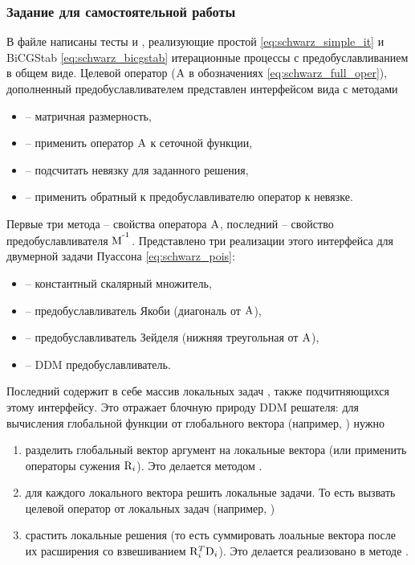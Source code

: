 \subsubsection{Задание для самостоятельной работы}

В файле 
написаны тесты  и ,
реализующие простой \cref{eq:schwarz_simple_it} и BiCGStab \cref{eq:schwarz_bicgstab} итерационные процессы с предобуславливанием
в общем виде.
Целевой оператор (${\rm A}$ в обозначениях \cref{eq:schwarz_full_oper}), дополненный предобуславливателем представлен интерфейсом вида
с методами
\begin{itemize}
\item {} -- матричная размерность,
\item {} -- применить оператор ${\rm A}$ к сеточной функции,
\item {} -- подсчитать невязку для заданного решения,
\item {} -- применить обратный к предобуславливателю оператор к невязке.
\end{itemize}
Первые три метода -- свойства оператора ${\rm A}$, последний -- свойство предобуславливателя ${\rm M}^{\textsuperscript {-1}}$.
Представлено три реализации этого интерфейса для двумерной задачи Пуассона \cref{eq:schwarz_pois}:
\begin{itemize}
\item {} -- константный скалярный множитель,
\item {} -- предобуславливатель Якоби (диагональ от ${\rm A}$),
\item {} -- предобуславливатель Зейделя (нижняя треугольная от ${\rm A}$),
\item {} -- DDM предобуславливатель.
\end{itemize}
Последний содержит в себе массив локальных задач , 
также подчитняющихся этому интерфейсу.
Это отражает блочную природу DDM решателя: для вычисления глобальной функции от глобального вектора (например, )
нужно
\begin{enumerate}
\item разделить глобальный вектор аргумент на локальные вектора (или применить операторы сужения ${\rm R}_i$). Это делается методом
.
\item для каждого локального вектора решить локальные задачи. То есть вызвать целевой оператор от локальных задач (например, )
\item срастить локальные решения (то есть суммировать лоальные вектора после их расширения со взвешиванием ${\rm R}_i^T {\rm D}_i$). Это делается реализовано в методе
.
\end{enumerate}

